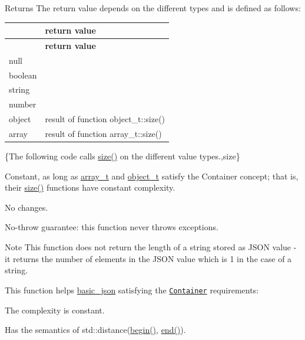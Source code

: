 \begin{DoxyReturn}{Returns}
The return value depends on the different types and is defined as follows\+: \tabulinesep=1mm
\begin{longtabu} spread 0pt [c]{*2{|X[-1]}|}
\hline
{}&{\bf return value  }\\
\endfirsthead
\hline
\endfoot
\hline
{}&{\bf return value  }\\
\endhead
null &{} \\
boolean &{} \\
string &{} \\
number &{} \\
object &result of function object\+\_\+t\+::size() \\
array &result of function array\+\_\+t\+::size() \\
\end{longtabu}
\{The following code calls {\ttfamily \hyperlink{classnlohmann_1_1basic__json_a25e27ad0c6d53c01871c5485e1f75b96}{size()}} on the different value types.,size\}
\end{DoxyReturn}
Constant, as long as \hyperlink{classnlohmann_1_1basic__json_a4c409f1b6d9caf3412c78af9a5883fed}{array\+\_\+t} and \hyperlink{classnlohmann_1_1basic__json_a0322396ca5cd4623bc816bf735377623}{object\+\_\+t} satisfy the Container concept; that is, their \hyperlink{classnlohmann_1_1basic__json_a25e27ad0c6d53c01871c5485e1f75b96}{size()} functions have constant complexity.

No changes.

No-\/throw guarantee\+: this function never throws exceptions.

\begin{DoxyNote}{Note}
This function does not return the length of a string stored as J\+S\+ON value -\/ it returns the number of elements in the J\+S\+ON value which is 1 in the case of a string.
\end{DoxyNote}
This function helps {\ttfamily \hyperlink{classnlohmann_1_1basic__json}{basic\+\_\+json}} satisfying the \href{https://en.cppreference.com/w/cpp/named_req/Container}{\tt Container} requirements\+:
\begin{DoxyItemize}
\item The complexity is constant.
\item Has the semantics of {\ttfamily std\+::distance(\hyperlink{classnlohmann_1_1basic__json_a0ff28dac23f2bdecee9564d07f51dcdc}{begin()}, \hyperlink{classnlohmann_1_1basic__json_a13e032a02a7fd8a93fdddc2fcbc4763c}{end()})}.
\end{DoxyItemize}

